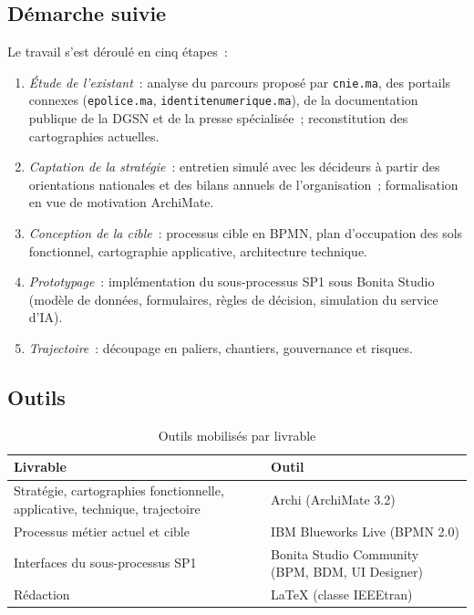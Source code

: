 \subsection{Démarche suivie}
Le travail s'est déroulé en cinq étapes~:
\begin{enumerate}
  \item \emph{Étude de l'existant}~: analyse du parcours proposé par \texttt{cnie.ma}, des portails connexes (\texttt{epolice.ma}, \texttt{identitenumerique.ma}), de la documentation publique de la DGSN et de la presse spécialisée~; reconstitution des cartographies actuelles.
  \item \emph{Captation de la stratégie}~: entretien simulé avec les décideurs à partir des orientations nationales et des bilans annuels de l'organisation~; formalisation en vue de motivation ArchiMate.
  \item \emph{Conception de la cible}~: processus cible en BPMN, plan d'occupation des sols fonctionnel, cartographie applicative, architecture technique.
  \item \emph{Prototypage}~: implémentation du sous-processus SP1 sous Bonita Studio \cite{bonita_doc} (modèle de données, formulaires, règles de décision, simulation du service d'IA).
  \item \emph{Trajectoire}~: découpage en paliers, chantiers, gouvernance et risques.
\end{enumerate}

\subsection{Outils}
\begin{table}[h]
\caption{Outils mobilisés par livrable}
\label{tab:outils}
\centering
\small
\begin{tabularx}{\columnwidth}{lX}
\toprule
\textbf{Livrable} & \textbf{Outil} \\
\midrule
Stratégie, cartographies fonctionnelle, applicative, technique, trajectoire & Archi (ArchiMate 3.2) \\
Processus métier actuel et cible & IBM Blueworks Live (BPMN 2.0) \\
Interfaces du sous-processus SP1 & Bonita Studio Community (BPM, BDM, UI Designer) \\
Rédaction & \LaTeX{} (classe IEEEtran) \\
\bottomrule
\end{tabularx}
\end{table}
